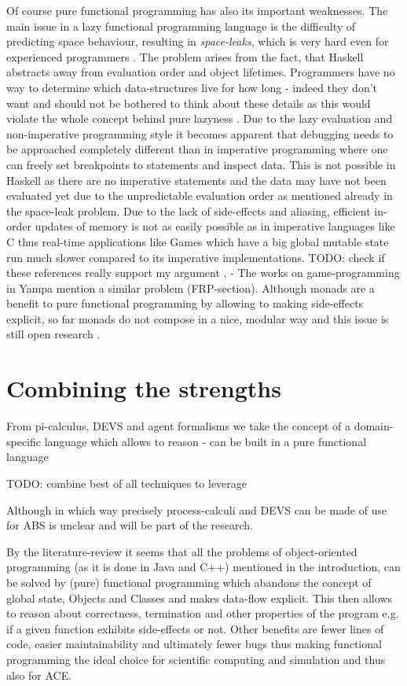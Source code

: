 Of course pure functional programming has also its important weaknesses. The main issue in a lazy functional programming language is the difficulty of predicting space behaviour, resulting in \textit{space-leaks}, which is very hard even for experienced programmers \cite{hudak_history_2007}. The problem arises from the fact, that Haskell abstracts away from evaluation order and object lifetimes. Programmers have no way to determine which data-structures live for how long - indeed they don't want and should not be bothered to think about these details as this would violate the whole concept behind pure lazyness \cite{hudak_history_2007}.
Due to the lazy evaluation and non-imperative programming style it becomes apparent that debugging needs to be approached completely different than in imperative programming where one can freely set breakpoints to statements and inspect data. This is not possible in Haskell as there are no imperative statements and the data may have not been evaluated yet due to the unpredictable evaluation order as mentioned already in the space-leak problem.
Due to the lack of side-effects and aliasing, efficient in-order updates of memory is not as easily possible as in imperative languages like C thus real-time applications like Games which have a big global mutable state run much slower compared to its imperative implementations.
TODO: check if these references really support my argument \cite{mun_hon_functional_2005}, \cite{meisinger_game-engine-architektur_2010} - The works on game-programming in Yampa mention a similar problem (FRP-section).
Although monads are a benefit to pure functional programming by allowing to making side-effects explicit, so far monads do not compose in a nice, modular way and this issue is still open research \cite{hudak_history_2007}.

\section{Combining the strengths}
From pi-calculus, DEVS and agent formalisms we take the concept of a domain-specific language which allows to reason - can be built in a pure functional language

TODO: combine best of all techniques to leverage

Although in which way precisely process-calculi and DEVS can be made of use for ABS is unclear and will be part of the research.

By the literature-review it seems that all the problems of object-oriented programming (as it is done in Java and C++) mentioned in the introduction, can be solved by (pure) functional programming which abandons the concept of global state, Objects and Classes and makes data-flow explicit. This then allows to reason about correctness, termination and other properties of the program e.g. if a given function exhibits side-effects or not. Other benefits are fewer lines of code, easier maintainability and ultimately fewer bugs thus making functional programming the ideal choice for scientific computing and simulation and thus also for ACE.

